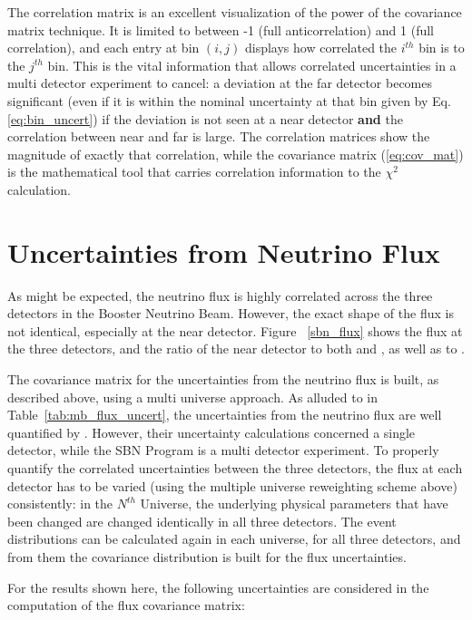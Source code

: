 The correlation matrix is an excellent visualization of the power of the covariance matrix technique.  It is limited to between -1 (full anticorrelation) and 1 (full correlation), and each entry at bin $(i,j)$ displays how correlated the $i^{th}$ bin is to the $j^{th}$ bin.  This is the vital information that allows correlated uncertainties in a multi detector experiment to cancel: a deviation at the far detector becomes significant (even if it is within the nominal uncertainty at that bin given by Eq. \ref{eq:bin_uncert}) if the deviation is not seen at a near detector {\bf and} the correlation between near and far is large.  The correlation matrices show the magnitude of exactly that correlation, while the covariance matrix (\ref{eq:cov_mat}) is the mathematical tool that carries correlation information to the $\chi^2$ calculation.


\section{Uncertainties from Neutrino Flux}

\label{section:flux_uncert}

As might be expected, the neutrino flux is highly correlated across the three detectors in the Booster Neutrino Beam.  However, the exact shape of the flux is not identical, especially at the near detector.  Figure~ \ref{sbn_flux} shows the flux at the three detectors, and the ratio of the near detector to both \uboone and \icarus, as well as \uboone to \icarus.

The covariance matrix for the uncertainties from the neutrino flux is built, as described above, using a multi universe approach.  As alluded to in Table~\ref{tab:mb_flux_uncert}, the uncertainties from the neutrino flux are well quantified by \MB.  However, their uncertainty calculations concerned a single detector, while the SBN Program is a multi detector experiment.  To properly quantify the correlated uncertainties between the three detectors, the flux at each detector has to be varied (using the multiple universe reweighting scheme above) consistently: in the $N^{th}$ Universe, the underlying physical parameters that have been changed are changed identically in all three detectors.  The event distributions can be calculated again in each universe, for all three detectors, and from them the covariance distribution is built for the flux uncertainties.

For the results shown here, the following uncertainties are considered in the computation of the flux covariance matrix:

